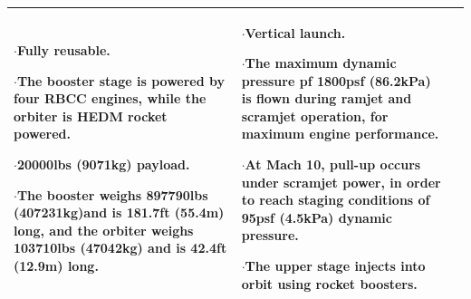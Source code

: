 {\begin{landscape}
\begin{xltabular}{\linewidth}{|X|X|X|}
	$\cdot$Fully reusable. 
	
	$\cdot$The booster stage is powered by four RBCC engines, while the orbiter is HEDM rocket powered. 
	
	$\cdot$20000lbs (9071kg) payload.
	
	$\cdot$The booster weighs 897790lbs (407231kg)and is 181.7ft (55.4m) long, and the orbiter weighs 103710lbs (47042kg) and is 42.4ft (12.9m) long.  
	
	&\small
	
	$\cdot$Vertical launch.
	
	$\cdot$The maximum dynamic pressure pf 1800psf (86.2kPa) is flown during ramjet and scramjet operation, for maximum engine performance. 
	
	$\cdot$At Mach 10, pull-up occurs under scramjet power, in order to reach staging conditions of 95psf (4.5kPa) dynamic pressure. 
	
	$\cdot$The upper stage injects into orbit using rocket boosters. 
	

	\\
\hline 
\end{xltabular} 
\end{landscape}
}

